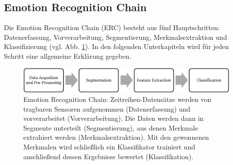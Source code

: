 \subsection{Emotion Recognition Chain} \label{emotion-recogniton-chain}


Die Emotion Recognition Chain (ERC) besteht aus f{\"u}nf Hauptschritten: 
Datenerfassung, Vorverarbeitung, Segmentierung, Merkmalsextraktion und Klassifizierung (vgl. Abb. \ref{fig:erc}).
In den folgenden Unterkapiteln wird f{\"u}r jeden Schritt eine allgemeine Erkl{\"a}rung gegeben. 

\begin{figure}[h]
\includegraphics[width=\textwidth]{Images/erc.png} 
\vspace{-0.3cm} 
\caption[Emotion Recognition Chain]{Emotion Recognition Chain: Zeitreihen-Datens{\"a}tze werden von tragbaren Sensoren aufgenommen (Datenerfassung) und vorverarbeitet (Vorverarbeitung). Die Daten werden dann in Segmente unterteilt (Segmentierung), aus denen Merkmale extrahiert werden (Merkmalsextraktion). Mit den gewonnenen Merkmalen wird schlie{\ss}lich ein Klassifikator trainiert und anschlie{\ss}end dessen Ergebnisse bewertet (Klassifikation).}
\label{fig:erc} 
\end{figure}











